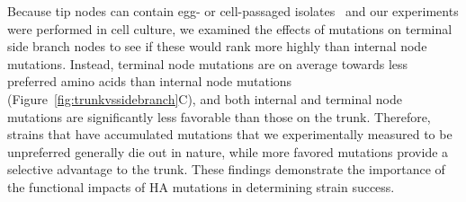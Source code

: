 \documentclass[9pt,twocolumn,twoside]{pnas-new}
\begin{document}
Because tip nodes can contain egg- or cell-passaged isolates~\citep{wu2017structural,mcwhite2016sequence,skowronski2016mutations} and our experiments were performed in cell culture, we examined the effects of mutations on terminal side branch nodes to see if these would rank more highly than internal node mutations.
Instead, terminal node mutations are on average towards less preferred amino acids than internal node mutations (Figure~\ref{fig:trunkvssidebranch}C), and both internal and terminal node mutations are significantly less favorable than those on the trunk.
Therefore, strains that have accumulated mutations that we experimentally measured to be unpreferred generally die out in nature, while more favored mutations provide a selective advantage to the trunk.
These findings demonstrate the importance of the functional impacts of HA mutations in determining strain success.
\end{document}
